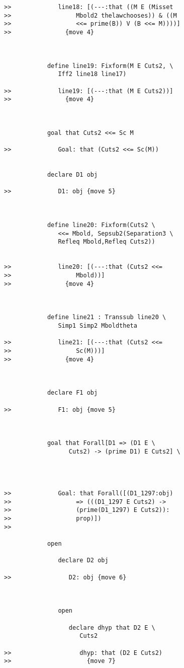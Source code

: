 \documentclass[12pt]{article}
\begin{document}
\begin{verbatim}
>>             line18: [(---:that ((M E (Misset
>>                  Mbold2 thelawchooses)) & ((M
>>                  <<= prime(B)) V (B <<= M))))]
>>               {move 4}



            define line19: Fixform(M E Cuts2, \
               Iff2 line18 line17)

>>             line19: [(---:that (M E Cuts2))]
>>               {move 4}



            goal that Cuts2 <<= Sc M

>>             Goal: that (Cuts2 <<= Sc(M))


            declare D1 obj

>>             D1: obj {move 5}



            define line20: Fixform(Cuts2 \
               <<= Mbold, Sepsub2(Separation3 \
               Refleq Mbold,Refleq Cuts2))


>>             line20: [(---:that (Cuts2 <<=
>>                  Mbold))]
>>               {move 4}



            define line21 : Transsub line20 \
               Simp1 Simp2 Mboldtheta

>>             line21: [(---:that (Cuts2 <<=
>>                  Sc(M)))]
>>               {move 4}



            declare F1 obj

>>             F1: obj {move 5}



            goal that Forall[D1 => (D1 E \
                  Cuts2) -> (prime D1) E Cuts2] \
               



>>             Goal: that Forall([(D1_1297:obj)
>>                  => (((D1_1297 E Cuts2) ->
>>                  (prime(D1_1297) E Cuts2)):
>>                  prop)])
>>               

            open

               declare D2 obj

>>                D2: obj {move 6}



               open

                  declare dhyp that D2 E \
                     Cuts2

>>                   dhyp: that (D2 E Cuts2)
>>                     {move 7}




\end{verbatim}
\end{document}
